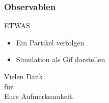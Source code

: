 \documentclass[11pt]{beamer}
\begin{document}
\begin{frame}
  \frametitle{Observablen}
    \vspace*{-0.3cm}
   \begin{block}{ETWAS}
    \begin{itemize} 
      \item Ein Partikel verfolgen
      \item Simulation als Gif darstellen
    \end{itemize}
  \end{block}
\end{frame}

\begin{frame}
    \vspace*{0.9cm}
    \centering
    \Huge
    Vielen Dank\\
    für\\
    Eure Aufmerksamkeit.\\
\end{frame}
\end{document}
